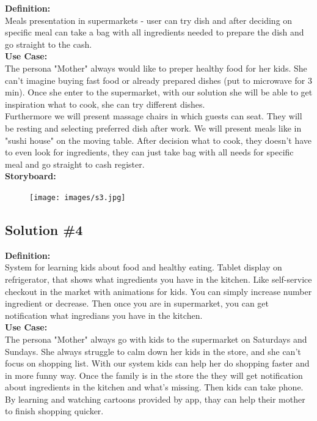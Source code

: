 \documentclass[a4paper,10pt,oneside]{scrreprt}
\begin{document}
		\noindent \textbf{Definition:}\\
			Meals presentation in supermarkets - user can try dish and after deciding on specific meal can take a bag with all ingredients needed to prepare the dish and go straight to the cash.\\

			\noindent \textbf{Use Case:}\\
			The persona "Mother" always would like to preper healthy food for her kids. She can't imagine buying fast food or
already prepared dishes (put to microwave for 3 min). Once she enter to the supermarket, with our solution she will
be able to get inspiration what to cook, she can try different dishes.\\

			Furthermore we will present massage chairs in which guests can seat. They will be resting and selecting preferred dish after work. We will present meals like in "sushi house" on the moving table. After decision what to cook, they doesn't have to
even look for ingredients, they can just take bag with all needs for specific meal and go straight to cash register.\\

			\noindent \textbf{Storyboard:}\\

			\begin{figure}[h]
				\centering
				\texttt{[image: images/s3.jpg]}
			\end{figure}

		\clearpage

		\subsection{Solution \#4}

		\noindent \textbf{Definition:}\\
			System for learning kids about food and healthy eating. Tablet display on refrigerator, that shows what ingredients you have in the kitchen. Like self-service checkout in the market with animations for kids. You can simply increase number ingredient or decrease. Then once you are in supermarket, you can get notification what ingredians you have in the kitchen.\\

			\noindent \textbf{Use Case:}\\
			The persona "Mother" always go with kids to the supermarket on Saturdays and  Sundays. She always struggle to calm down her kids in the store, and she can't focus on shopping list. With our system kids can help her do shopping faster and in more funny way. Once the family is in the store the they will get notification about ingredients in the kitchen and what's missing. Then kids can take phone. By learning and watching cartoons provided by app, thay can help their mother to finish shopping quicker.\\
\end{document}
